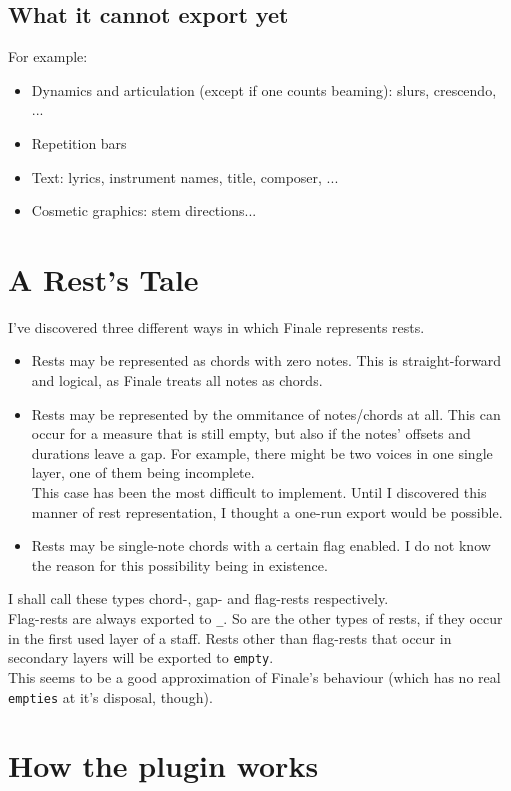 \documentclass{article}
\begin{document}
\subsection{What it cannot export yet}
For example:
\begin{itemize}
\item Dynamics and articulation (except if one counts beaming): slurs, crescendo, ...
\item Repetition bars
\item Text: lyrics, instrument names, title, composer, ...
\item Cosmetic graphics: stem directions...
\end{itemize}

\section{A Rest's Tale}
I've discovered three different ways in which Finale represents rests.
\begin{itemize}
\item Rests may be represented as chords with zero notes. This is
straight-forward and logical, as Finale treats all notes as chords.
\item Rests may be represented by the ommitance of notes/chords at all.
This can occur for a measure that is still empty, but also if the notes'
offsets and durations leave a gap. For example, there might be two voices
in one single layer, one of them being incomplete.\\
This case has been the most difficult to implement. Until I discovered this
manner of rest representation, I thought a one-run export would be possible.
\item Rests may be single-note chords with a certain flag enabled. I do
not know the reason for this possibility being in existence.
\end{itemize}
I shall call these types chord-, gap- and flag-rests respectively.\\
Flag-rests are always exported to \verb"_". So are the other types of rests,
if they occur in the first used layer of a staff. Rests other than flag-rests
that occur in secondary layers will be exported to \verb"empty".\\
This seems to be a good approximation of Finale's behaviour (which has no real
\verb"empties" at it's disposal, though).

\section{How the plugin works}
\end{document}
